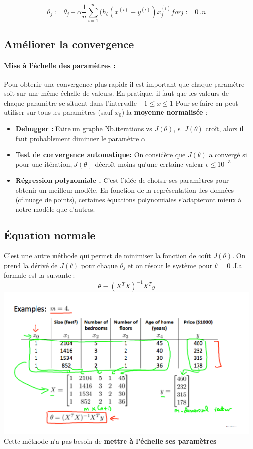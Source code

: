 \documentclass{article}
\theoremstyle{definition}
\begin{document}
\begin{equation}
\theta_j:=\theta_j - \alpha\frac{1}{n}\sum_{i=1}^{n} (h_\theta (x^{(i)}-y^{(i)})x_j^{(i)} forj:=0..n
\end{equation}
\subsection{Améliorer la convergence}
\paragraph{Mise à l'échelle des paramètres :}
Pour obtenir une convergence plus rapide il est important que chaque paramètre soit sur une même échelle de valeurs. En pratique, il faut que les valeurs de chaque paramètre se situent dans l'intervalle $-1 \leq x \leq 1$
Pour se faire on peut utiliser sur tous les paramètres (sauf $x_0$) la \textbf{moyenne normalisée} :
\begin{itemize}
	\item \textbf{Debugger :} Faire un graphe Nb.iterations vs $J(\theta)$, si $J(\theta)$ croît, alors il faut probablement diminuer le paramètre $\alpha$
	\item \textbf{Test de convergence automatique:} On considère que $J(\theta)$ a convergé si pour une itération, $J(\theta)$ décroît moins qu'une certaine valeur $\epsilon \leq 10^{-3}$
	\item \textbf{Régression polynomiale : } C'est l'idée de choisir ses paramètres pour obtenir un meilleur modèle. En fonction de la représentation des données (cf.nuage de points), certaines équations polynomiales s'adapteront mieux à notre modèle que d'autres.
\end{itemize}
\subsection{Équation normale}
C'est une autre méthode qui permet de minimiser la fonction de coût $J(\theta)$. On prend la dérivé de $J(\theta)$ pour chaque $\theta_j$ et on résout le système pour $\theta=0$ .La formule est la suivante :
\begin{equation}
\theta = (X^{T}X)^{-1}X^{T}y
\end{equation}
\includegraphics{normal-equation}
Cette méthode n'a pas besoin de \textbf{mettre à l'échelle ses paramètres}
\end{document}
